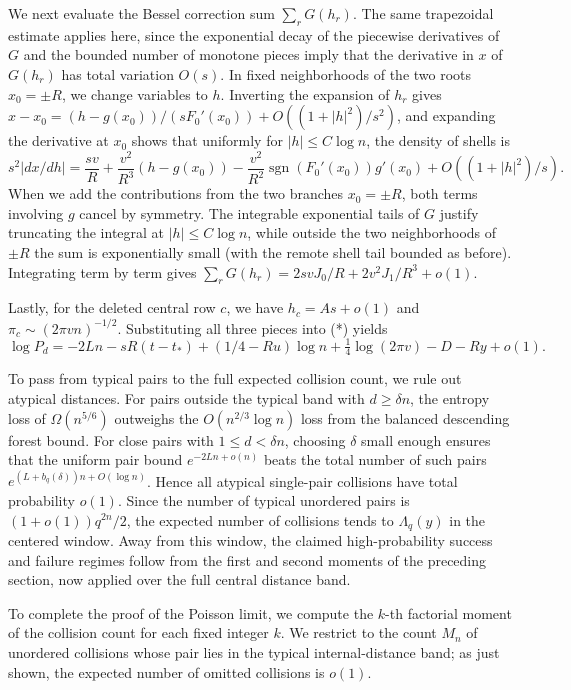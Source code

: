We next evaluate the Bessel correction sum \(\sum_r G(h_r)\). The same trapezoidal estimate applies here, since the exponential decay of the piecewise derivatives of \(G\) and the bounded number of monotone pieces imply that the derivative in \(x\) of \(G(h_r)\) has total variation \(O(s)\). In fixed neighborhoods of the two roots \(x_0=\pm R\), we change variables to \(h\). Inverting the expansion of \(h_r\) gives \(x-x_0=(h-g(x_0))/(sF_0'(x_0))+O((1+|h|^2)/s^2)\), and expanding the derivative at \(x_0\) shows that uniformly for \(|h|\le C\log n\), the density of shells is
\[
 s^2|dx/dh|
 =\frac{sv}{R}
  +\frac{v^2}{R^3}(h-g(x_0))
  -\frac{v^2}{R^2}\operatorname{sgn}(F_0'(x_0))g'(x_0)
  +O((1+|h|^2)/s).
\]
When we add the contributions from the two branches \(x_0=\pm R\), both terms involving \(g\) cancel by symmetry. The integrable exponential tails of \(G\) justify truncating the integral at \(|h|\le C\log n\), while outside the two neighborhoods of \(\pm R\) the sum is exponentially small (with the remote shell tail bounded as before). Integrating term by term gives \(\sum_rG(h_r)=2svJ_0/R+2v^2J_1/R^3+o(1)\).

Lastly, for the deleted central row \(c\), we have \(h_c=As+o(1)\) and \(\pi_c\sim(2\pi vn)^{-1/2}\). Substituting all three pieces into (*) yields
\[
 \log P_d=-2Ln-sR(t-t_*)+(1/4-Ru)\log n
             +\tfrac14\log(2\pi v)-D-Ry+o(1).
\]

To pass from typical pairs to the full expected collision count, we rule out atypical distances. For pairs outside the typical band with \(d\ge\delta n\), the entropy loss of \(\Omega(n^{5/6})\) outweighs the \(O(n^{2/3}\log n)\) loss from the balanced descending forest bound. For close pairs with \(1\le d<\delta n\), choosing \(\delta\) small enough ensures that the uniform pair bound \(e^{-2Ln+o(n)}\) beats the total number of such pairs \(e^{(L+b_q(\delta))n+O(\log n)}\). Hence all atypical single-pair collisions have total probability \(o(1)\). Since the number of typical unordered pairs is \((1+o(1))q^{2n}/2\), the expected number of collisions tends to \(\Lambda_q(y)\) in the centered window. Away from this window, the claimed high-probability success and failure regimes follow from the first and second moments of the preceding section, now applied over the full central distance band.

To complete the proof of the Poisson limit, we compute the \(k\)-th factorial moment of the collision count for each fixed integer \(k\). We restrict to the count \(M_n\) of unordered collisions whose pair lies in the typical internal-distance band; as just shown, the expected number of omitted collisions is \(o(1)\).

